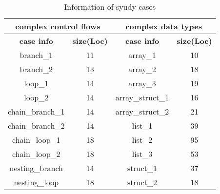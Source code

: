 \begin{table}[!h]
\center
\caption{Information of syudy cases}\label{tab:1}
\begin{tabular}{|c|c|c|c|}
\hline
\multicolumn{2}{|c|}{\textbf{complex control flows}} & \multicolumn{2}{|c|}{\textbf{complex data types}}\\
\hline
\textbf{case info} & \textbf{size(Loc)} & \textbf{case info} & \textbf{size(Loc)}\\
\hline
branch\_1 & 11 & array\_1 & 10\\
\hline
branch\_2 & 13 & array\_2 &	18\\
\hline
loop\_1 & 14 & array\_3 & 19\\
\hline
loop\_2 & 14 &	array\_struct\_1 &	16\\
\hline
chain\_branch\_1 & 14 &	array\_struct\_2 &	21\\
\hline
chain\_branch\_2 & 14 &	list\_1 &	39\\
\hline
chain\_loop\_1 & 18 &	list\_2 &	95\\
\hline
chain\_loop\_2 & 18 &	list\_3 &	53\\
\hline
nesting\_branch & 14 &	struct\_1 &	37\\
\hline
nesting\_loop & 18 &	struct\_2 &	18\\
\hline
\end{tabular}
\end{table}
%

